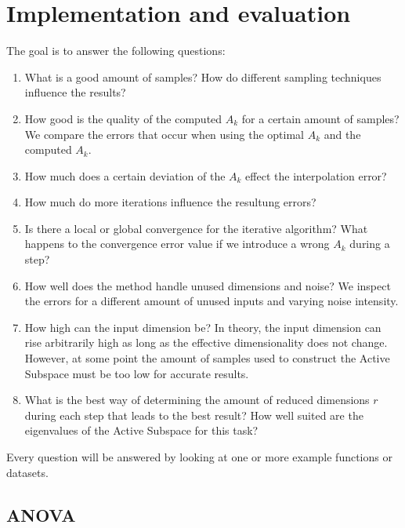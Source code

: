 \documentclass[
  a4paper,  %
  twoside,  %
  bibliography=totoc,
  headsepline,
  cleardoublepage=empty,
  parskip=half,
  draft=false
]{scrbook}
\begin{document}
\chapter{Implementation and evaluation}

The goal is to answer the following questions:

\begin{enumerate}
\item What is a good amount of samples? How do different sampling techniques influence the results?

\item How good is the quality of the computed $A_k$ for a certain amount of samples? We compare the errors that occur when using the optimal $A_k$ and the computed $A_k$.

\item How much does a certain deviation of the $A_k$ effect the interpolation error?

\item How much do more iterations influence the resultung errors?

\item Is there a local or global convergence for the iterative algorithm? What happens to the convergence error value if we introduce a wrong $A_k$ during a step?

\item How well does the method handle unused dimensions and noise? We inspect the errors for a different amount of unused inputs and varying noise intensity.

\item How high can the input dimension be? In theory, the input dimension can rise arbitrarily high as long as the effective dimensionality does not change. However, at some point the amount of samples used to construct the Active Subspace must be too low for accurate results.

\item What is the best way of determining the amount of reduced dimensions $r$ during each step that leads to the best result? How well suited are the eigenvalues of the Active Subspace for this task?
\end{enumerate}

Every question will be answered by looking at one or more example functions or datasets.


\section{ANOVA}
\end{document}
